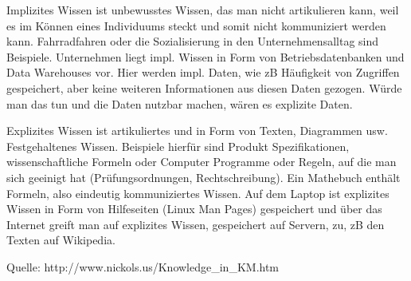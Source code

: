 \documentclass[10pt,a4paper]{article}
\begin{document}
Implizites Wissen ist unbewusstes Wissen, das man nicht artikulieren kann, weil es im Können eines Individuums steckt und somit nicht kommuniziert werden kann. Fahrradfahren oder die Sozialisierung in den Unternehmensalltag sind Beispiele.
Unternehmen liegt impl. Wissen in Form von Betriebsdatenbanken und Data Warehouses vor. Hier werden impl. Daten, wie zB Häufigkeit von Zugriffen gespeichert, aber keine weiteren Informationen aus diesen Daten gezogen. Würde man das tun und die Daten nutzbar machen, wären es explizite Daten.

Explizites Wissen ist artikuliertes und in Form von Texten, Diagrammen usw. Festgehaltenes Wissen. Beispiele hierfür sind Produkt Spezifikationen, wissenschaftliche Formeln oder Computer Programme oder Regeln, auf die man sich geeinigt hat (Prüfungsordnungen, Rechtschreibung).
Ein Mathebuch enthält Formeln, also eindeutig kommuniziertes Wissen.
Auf dem Laptop ist explizites Wissen in Form von Hilfeseiten (Linux Man Pages) gespeichert und über das Internet greift man auf explizites Wissen, gespeichert auf Servern, zu, zB den Texten auf Wikipedia.

Quelle: http://www.nickols.us/Knowledge_in_KM.htm
		
\end{document}
